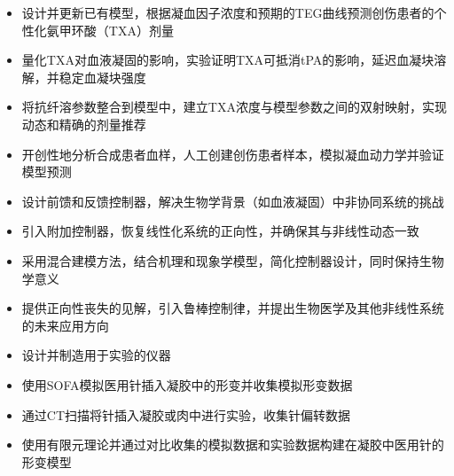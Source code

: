 \documentclass{resume}
\begin{document}
\vspace{-0.7em}
\begin{onehalfspacing}
  \begin{itemize}
    \item 设计并更新已有模型，根据凝血因子浓度和预期的TEG曲线预测创伤患者的个性化氨甲环酸（TXA）剂量
    \item 量化TXA对血液凝固的影响，实验证明TXA可抵消tPA的影响，延迟血凝块溶解，并稳定血凝块强度
    \item 将抗纤溶参数整合到模型中，建立TXA浓度与模型参数之间的双射映射，实现动态和精确的剂量推荐
    \item 开创性地分析合成患者血样，人工创建创伤患者样本，模拟凝血动力学并验证模型预测
  \end{itemize}
\end{onehalfspacing}

\vspace{-0.7em}
\begin{onehalfspacing}
  \begin{itemize}
    \item 设计前馈和反馈控制器，解决生物学背景（如血液凝固）中非协同系统的挑战
    \item 引入附加控制器，恢复线性化系统的正向性，并确保其与非线性动态一致
    \item 采用混合建模方法，结合机理和现象学模型，简化控制器设计，同时保持生物学意义
    \item 提供正向性丧失的见解，引入鲁棒控制律，并提出生物医学及其他非线性系统的未来应用方向
  \end{itemize}
\end{onehalfspacing}

\vspace{-0.7em}
\begin{onehalfspacing}
  \begin{itemize}
    \item 设计并制造用于实验的仪器
    \item 使用SOFA模拟医用针插入凝胶中的形变并收集模拟形变数据
    \item 通过CT扫描将针插入凝胶或肉中进行实验，收集针偏转数据
    \item 使用有限元理论并通过对比收集的模拟数据和实验数据构建在凝胶中医用针的形变模型
  \end{itemize}
\end{onehalfspacing}
\end{document}
